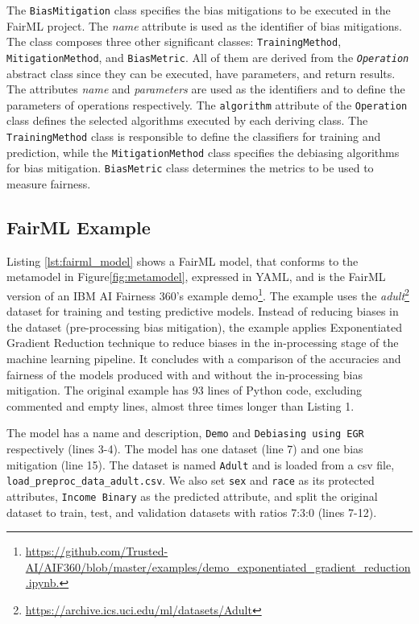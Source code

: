 \documentclass[sigconf]{acmart}
\begin{document}
{		The \texttt{BiasMitigation} class specifies the bias mitigations to be executed in the FairML project. The \textit{name} attribute is used as the identifier of bias mitigations. The class composes three other significant classes: \texttt{TrainingMethod}, \texttt{MitigationMethod}, and \texttt{BiasMetric}. All of them are derived from the \texttt{\textit{Operation}} abstract class since they can be executed, have parameters, and return results. The attributes \textit{name} and \textit{parameters} are used as the identifiers and to define the parameters of operations respectively. The \texttt{algorithm} attribute of the \texttt{Operation} class defines the selected algorithms executed by each deriving class. The \texttt{TrainingMethod} class is responsible to define the classifiers for training and prediction, while the \texttt{MitigationMethod} class specifies the debiasing algorithms for bias mitigation. \texttt{BiasMetric} class determines the metrics to be used to measure fairness. 
		
		\subsection{FairML Example}
		\label{sec:fairml_example}	
		Listing \ref{lst:fairml_model} shows a FairML model, that conforms to the metamodel in Figure\ref{fig:metamodel}, expressed in YAML, and is the FairML version of an IBM AI Fairness 360's example demo\footnote{\url{https://github.com/Trusted-AI/AIF360/blob/master/examples/demo_exponentiated_gradient_reduction.ipynb.}}. 	
		The example uses the \textit{adult}\footnote{\url{https://archive.ics.uci.edu/ml/datasets/Adult}} dataset for training and testing predictive models. Instead of reducing biases in the dataset (pre-processing bias mitigation), the example applies Exponentiated Gradient Reduction technique to reduce biases in the in-processing stage of the machine learning pipeline. It concludes with a comparison of the accuracies and fairness of the models produced with and without the in-processing bias mitigation. The original example has 93 lines of Python code, excluding commented and empty lines, almost three times longer than Listing 1.
		
		The model has a name and description, \texttt{Demo} and \texttt{Debiasing using EGR} respectively (lines 3-4). The model has one dataset (line 7) and one bias mitigation (line 15). The dataset is named \texttt{Adult} and is loaded from a csv file, \texttt{load\_preproc\_data\_adult.csv}. We also set \texttt{sex} and \texttt{race} as its protected attributes, \texttt{Income Binary} as the predicted attribute, and split the original dataset to train, test, and validation datasets with ratios 7:3:0 (lines 7-12). 
		
}
\end{document}
